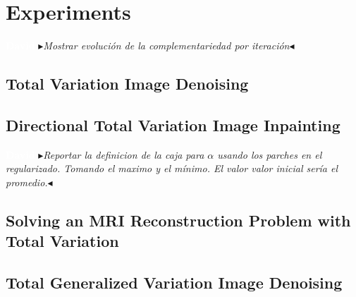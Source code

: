 \documentclass[review,onefignum,onetabnum]{siamonline190516}
\newcommand{\nb}[3]{
		{\colorbox{#2}{\bfseries\sffamily\scriptsize\textcolor{white}{#1}}}
		{\textcolor{#2}{\sf\small$\blacktriangleright$\textit{#3}$\blacktriangleleft$}}}
\newcommand{\dva}[1]{\nb{David}{white!30!red}{#1}}
\begin{document}
\section{Experiments}
\dva{Mostrar evolución de la complementariedad por iteración}
\subsection{Total Variation Image Denoising}
\subsection{Directional Total Variation Image Inpainting}

\dva{Reportar la definicion de la caja para $\alpha$ usando los parches en el regularizado. Tomando el maximo y el mínimo. El valor valor inicial sería el promedio.}
\subsection{Solving an MRI Reconstruction Problem with Total Variation}
\subsection{Total Generalized Variation Image Denoising}

% 
% 
% 

% 
% 
\printbibliography
\end{document}
